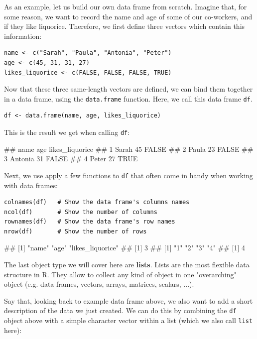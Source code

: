 As an example, let us build our own data frame from scratch. Imagine that, for some reason, we want to record the name and age of some of our co-workers, and if they like liquorice.  Therefore, we first define three vectors which contain this information:

\begin{lstlisting}
name <- c("Sarah", "Paula", "Antonia", "Peter")
age <- c(45, 31, 31, 27)
likes_liquorice <- c(FALSE, FALSE, FALSE, TRUE)
\end{lstlisting}

Now that these three same-length vectors are defined, we can bind them together in a data frame, using the \texttt{data.frame} function. Here, we call this data frame \texttt{df}. 

\begin{lstlisting}
df <- data.frame(name, age, likes_liquorice)
\end{lstlisting}

This is the result we get when calling \texttt{df}:

\begin{example}
##      name age likes_liquorice
## 1   Sarah  45           FALSE
## 2   Paula  23           FALSE
## 3 Antonia  31           FALSE
## 4   Peter  27            TRUE
\end{example}

Next, we use apply a few functions to \texttt{df} that often come in handy when working with data frames:

\begin{lstlisting}
colnames(df)   # Show the data frame's columns names
ncol(df)       # Show the number of columns
rownames(df)   # Show the data frame's row names
nrow(df)       # Show the number of rows
\end{lstlisting}
\begin{example}
## [1] "name" "age" "likes_liquorice"
## [1] 3
## [1] "1" "2" "3" "4"
## [1] 4
\end{example}

The last object type we will cover here are \textbf{lists}. Lists are the most flexible data structure in \textsf{R}. They allow to collect any kind of object in one "overarching" object (e.g. data frames, vectors, arrays, matrices, scalars, ...).

Say that, looking back to example data frame above, we also want to add a short description of the data we just created. We can do this by combining the \texttt{df} object above with a simple character vector within a list (which we also call \texttt{list} here):

